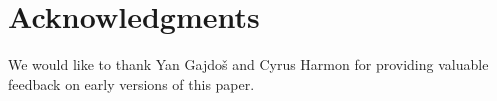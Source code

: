 \section{Acknowledgments} 

We would like to thank Yan Gajdoš and Cyrus Harmon for providing
valuable feedback on early versions of this paper.
